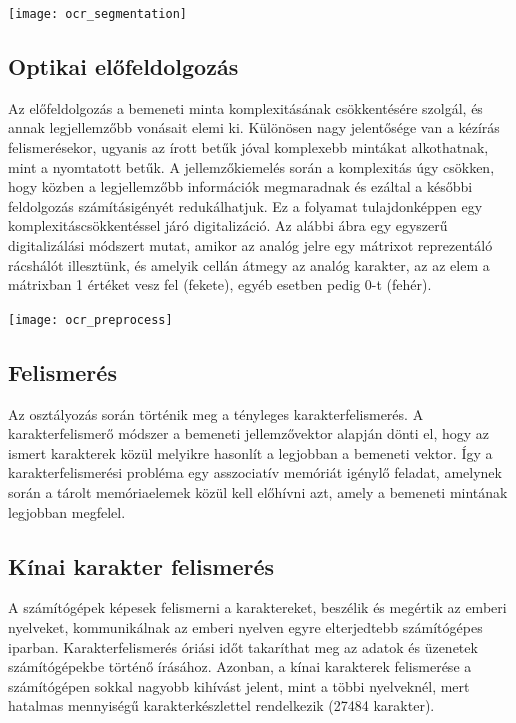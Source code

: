 \begin{center}
\texttt{[image: ocr\_segmentation]}
\end{center}

\subsection{Optikai előfeldolgozás}

Az előfeldolgozás a bemeneti minta komplexitásának csökkentésére szolgál, és annak legjellemzőbb vonásait elemi ki. Különösen nagy jelentősége van a kézírás felismerésekor, ugyanis az írott betűk jóval komplexebb mintákat alkothatnak, mint a nyomtatott betűk. A jellemzőkiemelés során a komplexitás úgy csökken, hogy közben a legjellemzőbb információk megmaradnak és ezáltal a későbbi feldolgozás számításigényét redukálhatjuk. Ez a folyamat tulajdonképpen egy komplexitáscsökkentéssel járó digitalizáció. Az alábbi ábra egy egyszerű digitalizálási módszert mutat, amikor az analóg jelre egy mátrixot reprezentáló rácshálót illesztünk, és amelyik cellán átmegy az analóg karakter, az az elem a mátrixban 1 értéket vesz fel (fekete), egyéb esetben pedig 0-t (fehér).

\begin{center}
\texttt{[image: ocr\_preprocess]}
\end{center}

\subsection{Felismerés}

Az osztályozás során történik meg a tényleges karakterfelismerés. A karakterfelismerő módszer a bemeneti jellemzővektor alapján dönti el, hogy az ismert karakterek közül melyikre hasonlít a legjobban a bemeneti vektor. Így a karakterfelismerési probléma egy asszociatív memóriát igénylő feladat, amelynek során a tárolt memóriaelemek közül kell előhívni azt, amely a bemeneti mintának legjobban megfelel.\\

\subsection{Kínai karakter felismerés}

A számítógépek képesek felismerni a karaktereket, beszélik és megértik az emberi nyelveket, kommunikálnak az emberi nyelven egyre elterjedtebb számítógépes iparban. Karakterfelismerés óriási időt takaríthat meg az adatok és üzenetek számítógépekbe történő írásához. Azonban, a kínai karakterek felismerése a számítógépen sokkal nagyobb kihívást jelent, mint a többi nyelveknél, mert hatalmas mennyiségű karakterkészlettel rendelkezik (27484 karakter).

